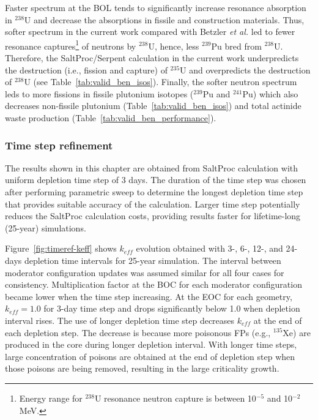 Faster spectrum at the \gls{BOL} tends to significantly increase resonance 
absorption
in $^{238}$U and decrease the absorptions in fissile and 
construction materials. Thus, softer spectrum in the current work compared 
with Betzler \emph{et al.} led to fewer resonance captures\footnote{Energy 
range for $^{238}$U resonance neutron capture is between 10$^{-5}$ and 
10$^{-2}$ MeV.} of neutrons by $^{238}$U, hence, less $^{239}$Pu bred from 
$^{238}$U. Therefore, the SaltProc/Serpent calculation in the current work 
underpredicts the destruction (i.e., fission and capture) of $^{235}$U and 
overpredicts the destruction of $^{238}$U (see 
Table~\ref{tab:valid_ben_isos}). 
Finally, the softer neutron spectrum leds to more fissions in fissile 
plutonium isotopes ($^{239}$Pu and $^{241}$Pu) which also decreases 
non-fissile plutonium (Table~\ref{tab:valid_ben_isos}) and total actinide 
waste production (Table~\ref{tab:valid_ben_performance}).


\subsubsection{Time step refinement}\label{sec:time-refinement}
The results shown in this chapter are obtained from SaltProc calculation with 
uniform depletion time step of 3 days. The duration of the time step was 
chosen after performing parametric sweep to determine the longest depletion 
time step that provides suitable accuracy of the calculation. Larger time step 
potentially reduces the SaltProc calculation costs, providing results faster 
for lifetime-long (25-year) simulations. 

Figure~\ref{fig:timeref-keff} shows $k_{eff}$ evolution obtained with 3-, 6-, 
12-, and 24-days depletion time intervals for 25-year simulation. The interval 
between moderator configuration updates was assumed similar for all four cases 
for consistency. Multiplication factor at the \gls{BOC} for each moderator 
configuration became lower when the time step increasing. At the \gls{EOC} for 
each geometry, $k_{eff}=1.0$  for 3-day time step and drops significantly 
below 1.0 when depletion interval rises. The use of longer depletion time step 
decreases $k_{eff}$ at the end of each depletion step. The decrease is because 
more poisonous \glspl{FP} (e.g., $^{135}$Xe) are produced in the core during 
longer depletion interval. With longer time steps, large concentration of 
poisons are obtained at the end of depletion step when those poisons are being 
removed, resulting in the large criticality growth. 

